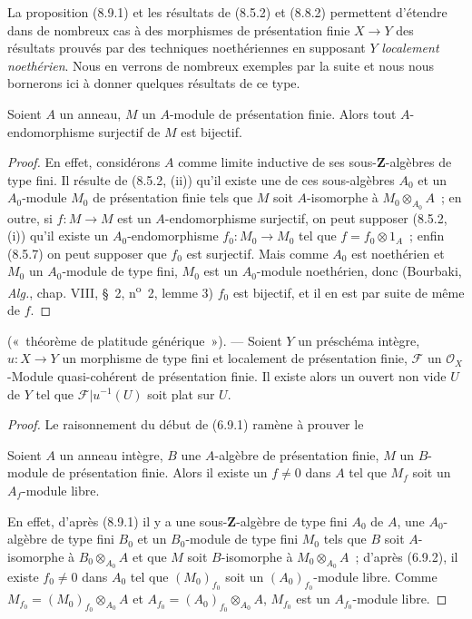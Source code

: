 \begin{env}[8.9.2]
\label{IV.8.9.2-fr}
La proposition (8.9.1) et les résultats de (8.5.2) et (8.8.2) permettent
d'étendre dans de nombreux cas à des morphismes de présentation finie
$X\to Y$ des résultats prouvés par des techniques noethériennes en supposant
$Y$ \emph{localement noethérien}.
Nous en verrons de nombreux exemples par la suite et nous nous bornerons ici
à donner quelques résultats de ce type.
\end{env}

\begin{proposition}[8.9.3]
\label{IV.8.9.3-fr}
Soient $A$ un anneau, $M$ un $A$-module de présentation finie. Alors tout
$A$-endomorphisme surjectif de $M$ est bijectif.
\end{proposition}

\begin{proof}
En effet, considérons $A$ comme limite inductive de ses sous-$\mathbf Z$-algèbres
de type fini. Il résulte de (8.5.2, (ii)) qu'il existe une de ces sous-algèbres
$A_0$ et un $A_0$-module $M_0$ de présentation finie tels que $M$ soit
$A$-isomorphe à $M_0\otimes_{A_0}A$~; en outre, si $f:M\to M$ est un
$A$-endomorphisme surjectif, on peut supposer (8.5.2, (i)) qu'il existe un
$A_0$-endomorphisme $f_0:M_0\to M_0$ tel que $f=f_0\otimes1_A$~; enfin
(8.5.7) on peut supposer que $f_0$ est surjectif. Mais comme $A_0$ est
noethérien et $M_0$ un $A_0$-module de type fini, $M_0$ est un $A_0$-module
noethérien, donc (Bourbaki, \emph{Alg.}, chap. VIII, \S~2, n\textsuperscript{o}~2,
lemme 3) $f_0$ est bijectif, et il en est par suite de même de $f$.
\end{proof}

\begin{proposition}[8.9.4]
\label{IV.8.9.4-fr}
(«~théorème de platitude générique~»). --- Soient $Y$ un préschéma intègre,
$u:X\to Y$ un morphisme de type fini et localement de présentation finie,
$\mathcal F$ un $\mathcal O_X$-Module quasi-cohérent de présentation finie. Il
existe alors un ouvert non vide $U$ de $Y$ tel que
$\mathcal F|u^{-1}(U)$ soit plat sur $U$.
\end{proposition}

\begin{proof}
Le raisonnement du début de (6.9.1) ramène à prouver le

\begin{lemma}[8.9.4.1]
\label{IV.8.9.4.1-fr}
Soient $A$ un anneau intègre, $B$ une $A$-algèbre de présentation finie,
$M$ un $B$-module de présentation finie. Alors il existe un $f\neq0$ dans
$A$ tel que $M_f$ soit un $A_f$-module libre.
\end{lemma}

En effet, d'après (8.9.1) il y a une sous-$\mathbf Z$-algèbre de type fini
$A_0$ de $A$, une $A_0$-algèbre de type fini $B_0$ et un $B_0$-module de type
fini $M_0$ tels que $B$ soit $A$-isomorphe à $B_0\otimes_{A_0}A$ et que $M$
soit $B$-isomorphe à $M_0\otimes_{A_0}A$~; d'après (6.9.2), il existe
$f_0\neq0$ dans $A_0$ tel que $(M_0)_{f_0}$ soit un
$(A_0)_{f_0}$-module libre. Comme
$M_{f_0}=(M_0)_{f_0}\otimes_{A_0}A$ et
$A_{f_0}=(A_0)_{f_0}\otimes_{A_0}A$, $M_{f_0}$ est un $A_{f_0}$-module libre.
\end{proof}

